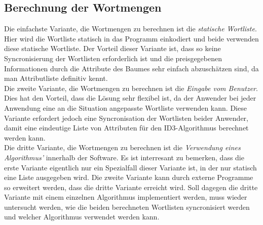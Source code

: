 \documentclass{article}
\theoremstyle{definition}
\theoremstyle{remark}
\begin{document}
\subsection{Berechnung der Wortmengen}
Die einfachste Variante, die Wortmengen zu berechnen ist die {\em statische
Wortliste}. Hier wird die Wortliste statisch in das Programm einkodiert
und beide verwenden diese statische Wortliste. Der Vorteil dieser
Variante ist, dass so keine Syncronisierung der Wortlisten erforderlich ist
und die preisgegebenen Informationen durch die Attribute des Baumes
sehr einfach abzusch\"atzen sind, da man Attributliste definitiv kennt.\\
Die zweite Variante, die Wortmengen zu berechnen ist die {\em Eingabe
vom Benutzer}. Dies hat den Vorteil, dass die L\"osung sehr flexibel ist,
da der Anwender bei jeder Anwendung eine an die Situation angepasste
Wortliste verwenden kann. Diese Variante erfordert jedoch eine Syncronisation
der Wortlisten beider Anwender, damit eine eindeutige Liste von Attributen
f\"ur den ID3-Algorithmus berechnet werden kann.\\
Die dritte Variante, die Wortmengen zu berechnen ist die {\em Verwendung
eines Algorithmus'} innerhalb der Software. Es ist interresant zu bemerken,
dass die erste Variante eigentlich nur ein Spezialfall dieser Variante ist,
in der nur statisch eine Liste ausgegeben wird. Die zweite Variante kann
durch externe Programme so erweitert werden, dass die dritte Variante erreicht
wird. Soll dagegen die dritte Variante mit einem einzelnen Algorithmus
implementiert werden, muss wieder untersucht werden, wie die beiden
berechneten Wortlisten syncronisiert werden und welcher Algorithmus verwendet
werden kann.\\
\end{document}
